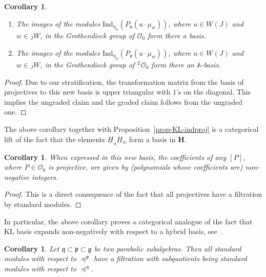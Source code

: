 \documentclass[a4paper]{amsart}
\newtheorem{corollary}[theorem]{Corollary}
\begin{document}
\begin{corollary}\label{cor-s3.3-1}
{\hspace{2mm}}

{

\begin{enumerate}[$($a$)$]
\item\label{cor-s3.3-1.1} The images of the modules
$\mathrm{Ind}_{\eta_w}(P_\mathfrak{a}(u\cdot \mu_w))$, 
where $u\in W(J)$ and $w\in {}_JW$, 
in the Grothendieck group of $\mathcal{O}_0$
form there a basis.
\item\label{cor-s3.3-1.2} The images of the modules
$\mathrm{Ind}_{\eta_w}(P_\mathfrak{a}(u\cdot \mu_w))$, 
where $u\in W(J)$ and $w\in {}_JW$, 
in the Grothendieck group of  ${}^{\mathbb{Z}}\mathcal{O}_0$
form there an $\mathbb{A}$-basis.
\end{enumerate}
}
\end{corollary}

\begin{proof}
Due to our stratification, the transformation matrix from 
the basis of projectives to this new basis is upper triangular
with $1$'s on the diagonal. This implies the {
ungraded claim and the graded claim follows from the ungraded one.}
\end{proof}

The above corollary together with Proposition~\ref{prop-KL-indproj} 
is a categorical lift of the fact that the elements $\underline{H}_uH_w$ 
form a basis in $\mathbf{H}$. 

\begin{corollary}\label{cor-s3.3-2}
When expressed in this new basis, the coefficients 
of any $[P]$, where $P\in \mathcal{O}_0$ is projective, 
are given by (polynomials whose coefficients are)
non-negative integers.
\end{corollary}

\begin{proof}
This is a direct consequence of the fact that all
projectives have a filtration by standard modules.
\end{proof}

In particular, the above corollary proves a categorical 
analogue of the fact that KL basis expands non-negatively 
with respect to a hybrid basis, see~\cite[Theorem~3.2]{GH07}.

\begin{corollary}\label{cor-s3.3-5}
Let $\mathfrak{q}\subset\mathfrak{p}\subset\mathfrak{g}$
be two parabolic subalgebras. Then all standard modules with respect to
$\preceq^{\mathfrak{p}}$ have a filtration with subquotients being
standard modules with respect to $\preceq^{\mathfrak{q}}$.
\end{corollary}
\end{document}
